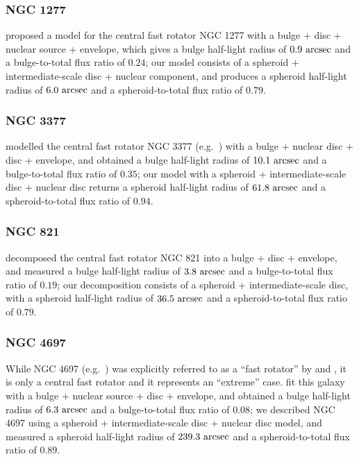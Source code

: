 \documentclass[useAMS,usenatbib,article]{mnras}
\begin{document}
\subsubsection{NGC 1277}
\cite{vandenbosch2012} proposed a model for the central fast rotator NGC 1277 with a bulge + disc + nuclear source + envelope, 
which gives a bulge half-light radius of $0.9~\rm arcsec$ and a bulge-to-total flux ratio of $0.24$; 
our model consists of a spheroid + intermediate-scale disc + nuclear component, 
and produces a spheroid half-light radius of $6.0~\rm arcsec$ and a spheroid-to-total flux ratio of $0.79$. 

\subsubsection{NGC 3377}
\cite{lasker2014data} modelled the central fast rotator NGC 3377 
(e.g.~\citealt{Jedrzejewski1987INPROCEEDINGS,scorzabender1995}) 
with a bulge + nuclear disc + disc + envelope, 
and obtained a bulge half-light radius of $10.1~\rm arcsec$ and a bulge-to-total flux ratio of $0.35$; 
our model with a spheroid + intermediate-scale disc + nuclear disc 
returns a spheroid half-light radius of $61.8~\rm arcsec$ and a spheroid-to-total flux ratio of $0.94$. 

\subsubsection{NGC 821}
\cite{lasker2014data} decomposed the central fast rotator NGC 821 into a bulge + disc + envelope, 
and measured a bulge half-light radius of $3.8~\rm arcsec$ and a bulge-to-total flux ratio of $0.19$; 
our decomposition consists of a spheroid + intermediate-scale disc, 
with a spheroid half-light radius of $36.5~\rm arcsec$ and a spheroid-to-total flux ratio of $0.79$. 

\subsubsection{NGC 4697}
While NGC 4697 (e.g.~\citealt{carter1987,Jedrzejewski1987n720n1052n4697,davies1981}) 
was explicitly referred to as a ``fast rotator'' by \cite{capaccioli1987} and \cite{petrou1981}, 
it is only a central fast rotator and it represents an ``extreme'' case. 
\cite{lasker2014data} fit this galaxy with a bulge + nuclear source + disc + envelope, 
and obtained a bulge half-light radius of $6.3~\rm arcsec$ and a bulge-to-total flux ratio of $0.08$; 
we described NGC 4697 using a spheroid + intermediate-scale disc + nuclear disc model, 
and measured a spheroid half-light radius of $239.3~\rm arcsec$ and a spheroid-to-total flux ratio of $0.89$. \\
\end{document}
